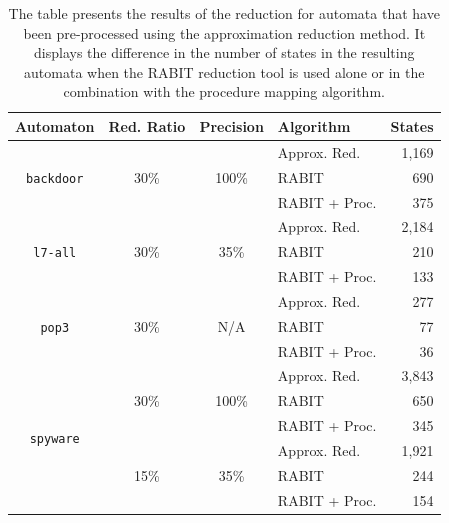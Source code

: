         \begin{table}[!h]
            \centering
            \captionsetup{justification=justified}
            \scriptsize
            \begin{tabular}{|c|c|c||l|r|}
                \hline
                Automaton        	& Red. Ratio & Precision & Algorithm & States \\[0.5ex]
                \hline\hline
                \multirow{3}{*}{\texttt{backdoor}} & \multirow{3}{*}{30\%} & \multirow{3}{*}{100\%} & Approx. Red. & 1,169\\[0.5ex]
                & & & RABIT & 690\\[0.5ex]
                & & & RABIT + Proc. & 375\\[0.5ex]
                \hline
                \multirow{3}{*}{\texttt{l7-all}} & \multirow{3}{*}{30\%} & \multirow{3}{*}{35\%} & Approx. Red. & 2,184\\[0.5ex]
                & & & RABIT & 210\\[0.5ex]
                & & & RABIT + Proc. & 133\\[0.5ex]
                \hline
                \multirow{3}{*}{\texttt{pop3}} & \multirow{3}{*}{30\%} & \multirow{3}{*}{N/A} & Approx. Red. & 277\\[0.5ex]
                & & & RABIT & 77\\[0.5ex]
                & & & RABIT + Proc. & 36\\[0.5ex]
                \hline
                \multirow{6}{*}{\texttt{spyware}} & \multirow{3}{*}{30\%} & \multirow{3}{*}{100\%} & Approx. Red. & 3,843\\[0.5ex]
                & & & RABIT & 650\\[0.5ex]
                & & & RABIT + Proc. & 345\\[0.5ex]
                \cline{2-5}
                & \multirow{3}{*}{15\%} & \multirow{3}{*}{35\%} & Approx. Red. & 1,921\\[0.5ex]
                & & & RABIT & 244\\[0.5ex]
                & & & RABIT + Proc. & 154\\[0.5ex]
                \hline
            \end{tabular}
            \normalsize
            \caption{The table presents the results of the reduction for automata that have been pre-processed using the approximation reduction method. It displays the difference in the number of states in the resulting automata when the RABIT reduction tool is used alone or in the combination with the procedure mapping algorithm.}
            \label{tab:states}
        \end{table}

